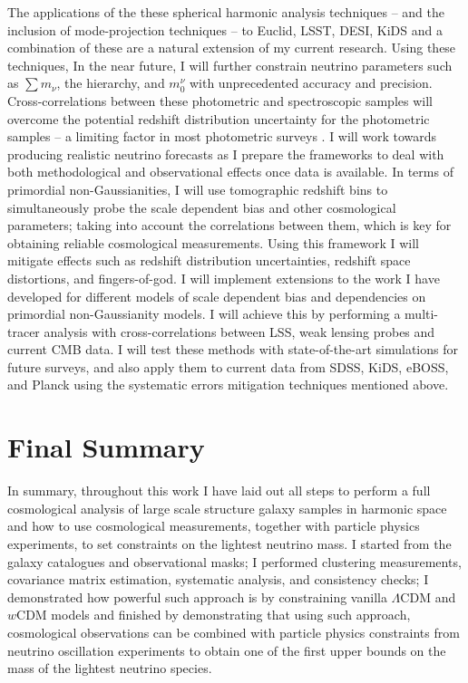 \qquad The applications of the these spherical harmonic analysis techniques -- and the inclusion of mode-projection techniques -- to Euclid, LSST, DESI, KiDS and a combination of these are a natural extension of my current research. Using these techniques, In the near future, I will further constrain neutrino parameters such as $\sum m_{\nu}$, the hierarchy, and $m_{0}^{\nu}$ with unprecedented accuracy and precision. Cross-correlations between these photometric and spectroscopic samples will overcome the potential redshift distribution uncertainty for the photometric samples -- a limiting factor in most photometric surveys \cite{2016McLeod}. I will work towards producing realistic neutrino forecasts as I prepare the frameworks to deal with both methodological and observational effects once data is available. In terms of primordial non-Gaussianities, I will use tomographic redshift bins to simultaneously probe the scale dependent bias and other cosmological parameters; taking into account the correlations between them, which is key for obtaining reliable cosmological measurements. Using this framework I will mitigate effects such as redshift distribution uncertainties, redshift space distortions, and fingers-of-god. I will implement extensions to the work I have developed for different models of scale dependent bias and dependencies on primordial non-Gaussianity models. I will achieve this by performing a multi-tracer analysis with cross-correlations between LSS, weak lensing probes and current CMB data. I will test these methods with state-of-the-art simulations for future surveys, and also apply them to current data from SDSS, KiDS, eBOSS, and Planck using the systematic errors mitigation techniques mentioned above. 

\section{Final Summary}
In summary, throughout this work I have laid out all steps to perform a full cosmological analysis of large scale structure galaxy samples in harmonic space and how to use cosmological measurements, together with particle physics experiments, to set constraints on the lightest neutrino mass. I started from the galaxy catalogues and observational masks; I performed clustering measurements, covariance matrix estimation, systematic analysis, and consistency checks; I demonstrated how powerful such approach is by constraining vanilla $\Lambda$CDM and $w$CDM models and finished by demonstrating that using such approach, cosmological observations can be combined with particle physics constraints from neutrino oscillation experiments to obtain one of the first upper bounds on the mass of the lightest neutrino species.

\vspace*{\fill}
